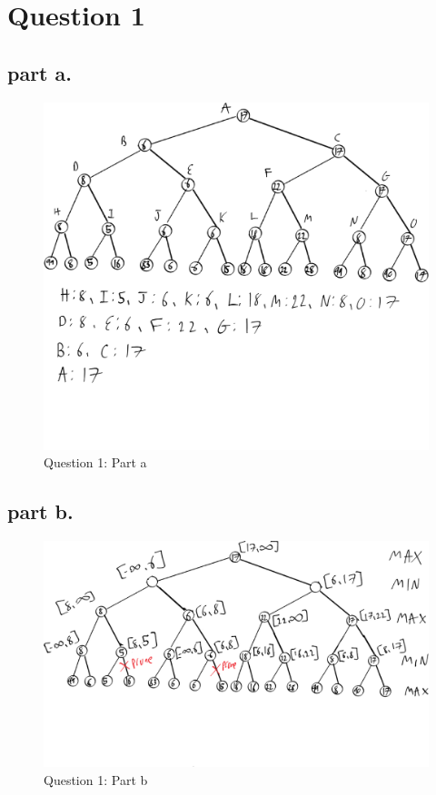 \section{Question 1}
\subsection{part a.}

\begin{figure}[H]
	\centering
  \includegraphics[scale = 0.70]{q1_part_a.png}
	\caption{Question 1: Part a}
	\label{fig: Q1 Part a}
\end{figure}


\subsection{part b.}

\begin{figure}[H]
	\centering
  \includegraphics[scale = 0.70]{q1_part_b.png}
	\caption{Question 1: Part b}
	\label{fig: Q1 Part b}
\end{figure}



